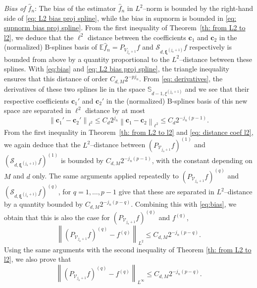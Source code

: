 \documentclass[preprint]{imsart}
\newcommand{\E}{{\mathbb E}}
\newcommand\norm[1]{\left\lVert#1\right\rVert}
\numberwithin{equation}{section}
\newcounter{cond}
\begin{document}
\begin{appendix}
\textit{Bias of $\hat{f}_n$}: The bias of the estimator $\hat{f}_n$ in $L^2$--norm is bounded by the right-hand side of \eqref{eq: L2 bias proj spline}, while the bias in supnorm is bounded in \eqref{eq: supnorm bias proj spline}.
From the first inequality of Theorem~\ref{th: from L2 to l2}, we deduce that the $\ell^2$ distance between the coefficients $\mathbf{c}_1$ and $\mathbf{c}_2$ in the (normalized) B-splines basis of $\E\hat{f}_n = P_{V_{j_n+1}}f$ and $\mathcal{S}_{d,\mathbf{\xi}^{(j_n+1)}}f$ respectively is bounded from above by a quantity proportional to the $L^2$--distance between these splines. With \eqref{eq:bias} and \eqref{eq: L2 bias proj spline}, the triangle inequality ensures that this distance of order $C_{d,M}2^{-pj_n}$. From \eqref{eq: derivatives}, the derivatives of these two splines lie in the space $\mathbb{S}_{d-1,\xi^{(j_n+1)}}$ and we see that their respective coefficients $\mathbf{c}_1'$ and $\mathbf{c}_2'$ in the (normalized) B-splines basis of this new space are separated in $\ell^2$ distance by at most \begin{equation}\label{eq: distance coef l2}\norm{\mathbf{c}_1'-\mathbf{c}_2'}_{\ell^2}\leq C_d2^{j_n}\norm{\mathbf{c}_1-\mathbf{c}_2}_{\ell^2}\leq C_d 2^{-j_n(p-1)}.\end{equation}
From the first inequality in Theorem~\ref{th: from L2 to l2} and \eqref{eq: distance coef l2}, we again deduce that the $L^2$--distance between $(P_{\mathcal{V}_{j_n+1}}f)^{(1)}$ and $(\mathcal{S}_{d,\mathbf{\xi}^{(j_n+1)}}f)^{(1)}$ is bounded by $C_{d,M}2^{-j_n(p-1)}$, with the constant depending on $M$ and $d$ only. The same arguments applied repeatedly to $\left(P_{\mathcal{V}_{j_n+1}}f\right)^{(q)}$ and $\left(\mathcal{S}_{d,\mathbf{\xi}^{(j_n+1)}}f\right)^{(q)}$, for $q=1,\dots,p-1$ give that these are separated in $L^2$--distance by a quantity bounded by $C_{d,M} 2^{-j_n(p-q)}$. Combining this with \eqref{eq:bias}, we obtain that this is also the case for $\left(P_{\mathcal{V}_{j_n+1}}f\right)^{(q)}$ and $f^{(q)}$,
\[\norm{\left(P_{\mathcal{V}_{j_n+1}}f\right)^{(q)}-f^{(q)}}_{L^2} \leq C_{d,M} 2^{-j_n(p-q)}.\]
Using the same arguments with the second inequality of Theorem \ref{th: from L2 to l2}, we also prove that
\begin{equation}\label{eq: supnorm bias proj}
\norm{\left(P_{\mathcal{V}_{j_n+1}}f\right)^{(q)}-f^{(q)}}_{L^\infty} \leq C_{d,M} 2^{-j_n(p-q)}.
\end{equation}



\end{appendix}
\end{document}
